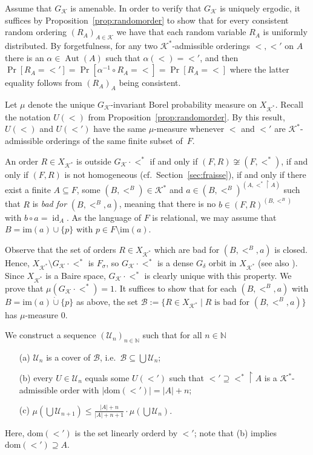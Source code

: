 \documentclass[12pt]{amsart}
\theoremstyle{plain}
\theoremstyle{definition}
\begin{document}
Assume that $G_{\mathcal K}$ is amenable. In order to verify that $G_{\mathcal K}$ is uniquely ergodic, it 
suffices by Proposition~\ref{prop:randomorder} to show that for every consistent random ordering $(R_A)_{A\in{\mathcal K}}$ we
 have that each random variable $R_A$ is uniformly distributed. By forgetfulness, for any two ${\mathcal K}^*$-admissible
 orderings $<,<'$ on $A$ there is an $\alpha\in\operatorname{Aut}(A)$ such that $\alpha(<)=<'$, and 
then $\Pr[R_A=<']=\Pr[\alpha^{-1}\circ R_A=<]=\Pr[R_A=<]$ where the latter equality follows from
$(R_A)_{A}$ being consistent. 

Let $\mu$ denote the unique $G_{\mathcal K}$-invariant Borel probability measure  on $X_{{\mathcal K}^*}$. Recall 
the notation $U(<)$ from Proposition~\ref{prop:randomorder}. By this result, $U(<)$ and $U(<')$ 
have the same $\mu$-measure whenever $<$ and $<'$ are  ${\mathcal K}^*$-admissible orderings of the same finite subset of~$F$.

An order $R\in X_{{\mathcal K}^*}$ 
is outside $G_{\mathcal K}\cdot <^*$ if and only if $(F,R)\not\cong(F,<^*)$, if 
and only if $(F,R)$ is not homogeneous (cf.~Section~\ref{sec:fraisse}), if and only if there exist a finite $A\subseteq F$, some $(B,<^B)\in{\mathcal K}^*$ and
$a\in (B,<^B)^{(A,<^*\upharpoonright A)}$ such that $R$ is {\em bad for} $(B,<^B,a)$, meaning that 
there is no $b\in (F,R)^{(B,<^B)}$ with $b\circ a= \operatorname{id}_A$. 
As the language of $F$ is relational, we may assume that $B={\mathrm{im}}(a)\cup\{p\}$ with $p\in F\setminus {\mathrm{im}}(a)$. 

Observe that the set of orders $R\in X_{{\mathcal K}^*}$ which are bad for $(B,<^B,a)$
is closed. Hence, $X_{{\mathcal K}^*}\setminus G_{\mathcal K}\cdot <^*$ is  $F_\sigma$, so 
$G_{\mathcal K}\cdot <^*$ is a dense $G_\delta$ orbit in $X_{{\mathcal K}^*}$ (see also \cite[14.3]{akl}). Since $X_{{\mathcal K}^*}$ is a Baire space, $G_{\mathcal K}\cdot <^*$ is clearly unique with this property. We prove that $\mu(G_{\mathcal K}\cdot <^*)=1$.
It suffices to show that for each $(B,<^B,a)$ with $B={\mathrm{im}}(a)\dot\cup\{p\}$ as above, the set
$\mathcal B:=\{R\in X_{{\mathcal K}^*}\mid  R \text{ is bad for }(B,<^B,a)\}$ has $\mu$-measure 0.

We construct a sequence $(\mathcal U_n)_{n\in\mathbb N}$ such that for all $n\in\mathbb N$
\begin{enumerate}
\item[(a)] $\mathcal U_n$ is a cover of $\mathcal B$, i.e.\ $\mathcal B\subseteq \bigcup\mathcal U_n$;
\item[(b)] every $U\in\mathcal U_n$ equals some $U(<')$ such that $<'\supseteq <^*\upharpoonright A$ is a ${\mathcal K}^*$-admissible order with 
$|{\textrm{dom}}(<')|=|A|+n$; 
\item[(c)] $\textstyle\mu(\bigcup \mathcal U_{n+1})\leq \frac{|A|+n}{|A|+n+1}\cdot\mu(\bigcup\mathcal U_n).$
\end{enumerate}
Here, ${\textrm{dom}}(<')$ is the set linearly orderd by $<'$; note that (b) implies ${\textrm{dom}}(<')\supseteq A$.
\end{document}

